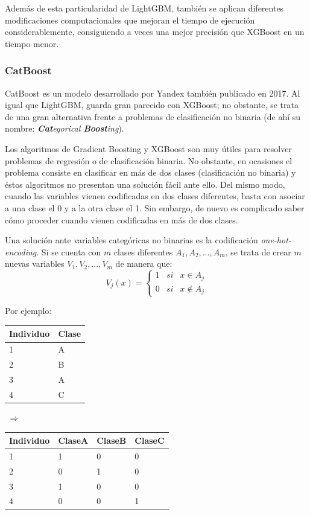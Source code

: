 \documentclass[12pt,twoside]{article}
\begin{document}
Además de esta particularidad de LightGBM, también se aplican diferentes modificaciones computacionales que mejoran el tiempo de ejecución considerablemente, consiguiendo a veces una mejor precisión que XGBoost en un tiempo menor.



\subsubsection{CatBoost}

CatBoost es un modelo desarrollado por Yandex también publicado en 2017. Al igual que LightGBM, guarda gran parecido con XGBoost; no obstante, se trata de una gran alternativa frente a problemas de clasificación no binaria (de ahí su nombre: \textit{\textbf{Cat}egorical \textbf{Boost}ing}).

Los algoritmos de Gradient Boosting y XGBoost son muy útiles para resolver problemas de regresión o de clasificación binaria. No obstante, en ocasiones el problema consiste en clasificar en más de dos clases (clasificación no binaria) y éstos algoritmos no presentan una solución fácil ante ello. Del mismo modo, cuando las variables vienen codificadas en dos clases diferentes, basta con asociar a una clase el 0 y a la otra clase el 1. Sin embargo, de nuevo es complicado saber cómo proceder cuando vienen codificadas en más de dos clases.

Una solución ante variables categóricas no binarias es la codificación \textit{one-hot-encoding}. Si se cuenta con $m$ clases diferentes $A_1, A_2, \dots, A_m$, se trata de crear $m$ nuevas variables $V_1, V_2, \dots, V_m$ de manera que:
\begin{equation*}
V_j(x) = 
\left\{
\begin{array}{ccc}
1 & si & x \in A_j \\
0 & si & x \not\in A_j
\end{array}
\right.
\end{equation*}

Por ejemplo:
\begin{center}
\begin{tabular}{|l|l|}
\hline
Individuo & Clase \\ \hline
1         & A     \\ \hline
2         & B     \\ \hline
3         & A     \\ \hline
4         & C     \\ \hline
\end{tabular}
$\, \, \Rightarrow \, \,$
\begin{tabular}{|l|l|l|l|}
\hline
Individuo & ClaseA & ClaseB & ClaseC \\ \hline
1         & 1 & 0 & 0     \\ \hline
2         & 0 & 1 & 0     \\ \hline
3         & 1 & 0 & 0     \\ \hline
4         & 0 & 0 & 1     \\ \hline
\end{tabular}
\end{center}
\end{document}
